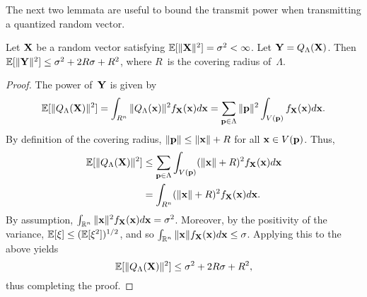 \begin{subappendices}
  The next two lemmata are useful to bound the transmit power when transmitting
  a quantized random vector.
  \begin{lemma}
    \label{lem:latquantvar}
    Let $\mathbf{X}$ be a random vector satisfying $\mathbb{E}[\|\mathbf{X}\|^2]
    = {\sigma^2} < \infty$. Let $\mathbf{Y} = {Q_{\Lambda}}(\mathbf{X})$. Then $\mathbb{E}[\|\mathbf{Y}\|^2] \le {\sigma^2} + 2R\sigma +
    R^2$, where $R$~is the covering radius of~$\Lambda$.
  \end{lemma}

  \begin{proof}
    The power of~$\mathbf{Y}$ is given by
    \begin{equation*}
      \mathbb{E}[\|{Q_{\Lambda}}(\mathbf{X})\|^2] = \int_{R^n} \|{Q_{\Lambda}}(\mathbf{x})\|^2 f_{\mathbf{X}}(\mathbf{x}) d\mathbf{x}
      = \sum_{\mathbf{p} \in \Lambda} \|\mathbf{p}\|^2 \int_{V(\mathbf{p})} f_{\mathbf{X}}(\mathbf{x}) d\mathbf{x}.
    \end{equation*}
    By definition of the covering radius, $\|\mathbf{p}\| \le \|\mathbf{x}\| + R$ for all $\mathbf{x}
    \in V(\mathbf{p})$. Thus,
    \begin{align*}
      \mathbb{E}[\|{Q_{\Lambda}}(\mathbf{X})\|^2] &\le \sum_{\mathbf{p} \in \Lambda} \int_{V(\mathbf{p})} (\|\mathbf{x}\| + R)^2
      f_{\mathbf{X}}(\mathbf{x}) d\mathbf{x} \\
      &= \int_{R^n} (\|\mathbf{x}\| + R)^2 f_{\mathbf{X}}(\mathbf{x}) d\mathbf{x}.
    \end{align*}
    By assumption, $\int_{\mathbb{R}^n} \|\mathbf{x}\|^2 f_{\mathbf{X}}(\mathbf{x}) d\mathbf{x} = {\sigma^2}$. Moreover, by the
    positivity of the variance, $\mathbb{E}[\xi] \le (\mathbb{E}[\xi^2])^{1/2}$, and so
    $\int_{\mathbb{R}^n} \|\mathbf{x}\| f_{\mathbf{X}}(\mathbf{x}) d\mathbf{x} \le \sigma$. Applying this to the above
    yields
    \begin{equation*}
      \mathbb{E}[\|{Q_{\Lambda}}(\mathbf{X})\|^2] \le {\sigma^2} + 2R\sigma + R^2,
    \end{equation*}
    thus completing the proof.
  \end{proof}


\end{subappendices}
